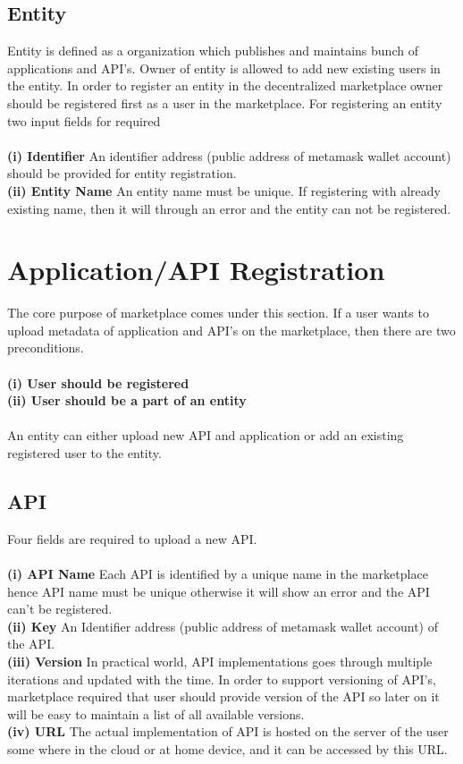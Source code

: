 \subsection {Entity} Entity is defined as a organization which publishes and maintains bunch of applications and API's. Owner of entity is allowed to add new existing users in the entity. In order to register an entity in the decentralized marketplace owner should be registered first as a user in the marketplace. For registering an entity two input fields for required\\\\
\textbf{(i) Identifier} 
An identifier address (public address of metamask wallet account) should be provided for entity registration.\\
\textbf{(ii) Entity Name}
An entity name must be unique. If registering with already existing name, then it will through an error and the entity can not be registered.\\

\section{Application/API Registration}
The core purpose of marketplace comes under this section. If a user wants to upload metadata of application and API's on the marketplace, then there are two preconditions.\\\\
\textbf{(i) User should be registered} 
\\
\textbf{(ii) User should be a part of an entity}\\
\\
An entity can either upload new API and application or add an existing registered user to the entity.
\subsection {API}
Four fields are required to upload a new API.\\\\
\textbf{(i) API Name} 
Each API is identified by a unique name in the marketplace hence API name must be unique otherwise it will show an error and the API can't be registered.\\
\textbf{(ii) Key}
An Identifier address (public address of metamask wallet account) of the API.\\
\textbf{(iii) Version}
In practical world, API implementations goes through multiple iterations and updated with the time. In order to support versioning of API's, marketplace required that user should provide version of the API so later on it will be easy to maintain a list of all available versions.\\
\textbf{(iv) URL}
The actual implementation of API is hosted on the server of the user some where in the cloud or at home device, and it can be accessed by this URL.\\

